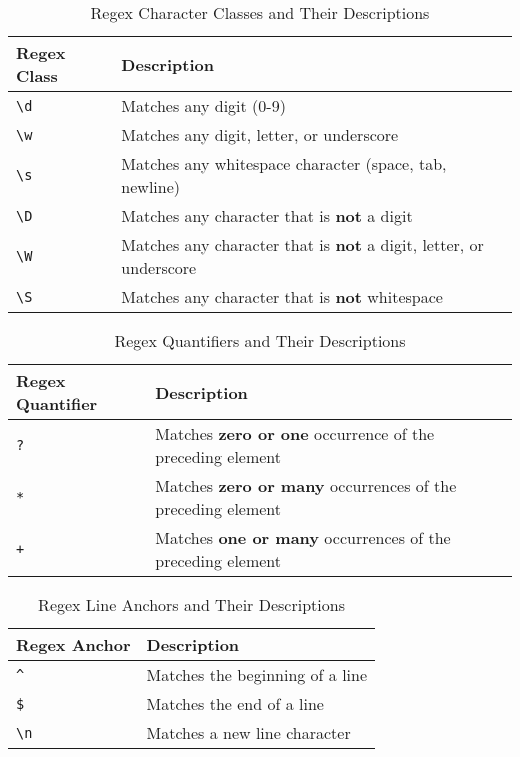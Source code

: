 \documentclass[11pt,parskip]{scrartcl}
\begin{document}
\begin{table}[h!]
\centering
\begin{tabular}{@{}ll@{}}
\toprule
\textbf{Regex Class} & \textbf{Description} \\ \midrule
\texttt{\textbackslash d}   & Matches any digit (0-9) \\
\texttt{\textbackslash w}   & Matches any digit, letter, or underscore \\
\texttt{\textbackslash s}   & Matches any whitespace character (space, tab, newline) \\
\texttt{\textbackslash D}   & Matches any character that is \textbf{not} a digit \\
\texttt{\textbackslash W}   & Matches any character that is \textbf{not} a digit, letter, or underscore \\
\texttt{\textbackslash S}   & Matches any character that is \textbf{not} whitespace \\ \bottomrule
\end{tabular}
\caption{Regex Character Classes and Their Descriptions}
\end{table}

\begin{table}[h!]
\centering
\begin{tabular}{@{}ll@{}}
\toprule
\textbf{Regex Quantifier} & \textbf{Description} \\ \midrule
\texttt{?}   & Matches \textbf{zero or one} occurrence of the preceding element \\
\texttt{*}   & Matches \textbf{zero or many} occurrences of the preceding element \\
\texttt{+}   & Matches \textbf{one or many} occurrences of the preceding element \\ \bottomrule
\end{tabular}
\caption{Regex Quantifiers and Their Descriptions}
\end{table}


\begin{table}[h!]
\centering
\begin{tabular}{@{}ll@{}}
\toprule
\textbf{Regex Anchor} & \textbf{Description} \\ \midrule
\texttt{\^}   & Matches the beginning of a line \\
\texttt{\$}   & Matches the end of a line \\
\texttt{\textbackslash n} & Matches a new line character \\ \bottomrule
\end{tabular}
\caption{Regex Line Anchors and Their Descriptions}
\end{table}
\end{document}
